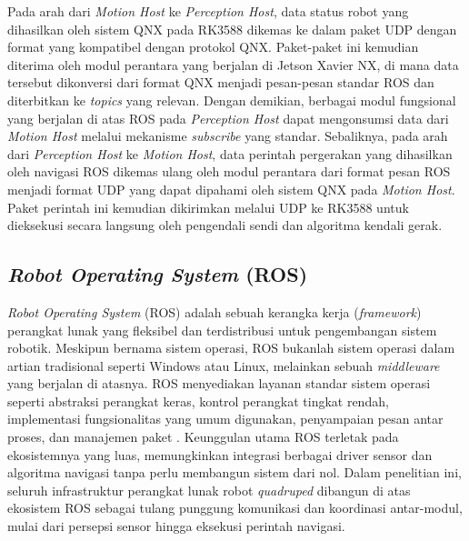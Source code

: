 Pada arah dari \textit{Motion Host} ke \textit{Perception Host}, data status robot yang dihasilkan oleh sistem QNX pada RK3588 dikemas ke dalam paket UDP dengan format yang kompatibel dengan protokol QNX. Paket-paket ini kemudian diterima oleh modul perantara yang berjalan di Jetson Xavier NX, di mana data tersebut dikonversi dari format QNX menjadi pesan-pesan standar ROS dan diterbitkan ke \textit{topics} yang relevan. Dengan demikian, berbagai modul fungsional yang berjalan di atas ROS pada \textit{Perception Host} dapat mengonsumsi data dari \textit{Motion Host} melalui mekanisme \textit{subscribe} yang standar. Sebaliknya, pada arah dari \textit{Perception Host} ke \textit{Motion Host}, data perintah pergerakan yang dihasilkan oleh navigasi ROS dikemas ulang oleh modul perantara dari format pesan ROS menjadi format UDP yang dapat dipahami oleh sistem QNX pada \textit{Motion Host}. Paket perintah ini kemudian dikirimkan melalui UDP ke RK3588 untuk dieksekusi secara langsung oleh pengendali sendi dan algoritma kendali gerak. 

\subsection{\textit{Robot Operating System} (ROS)}

\textit{Robot Operating System} (ROS) adalah sebuah kerangka kerja (\textit{framework}) perangkat lunak yang fleksibel dan terdistribusi untuk pengembangan sistem robotik. Meskipun bernama sistem operasi, ROS bukanlah sistem operasi dalam artian tradisional seperti Windows atau Linux, melainkan sebuah \textit{middleware} yang berjalan di atasnya. ROS menyediakan layanan standar sistem operasi seperti abstraksi perangkat keras, kontrol perangkat tingkat rendah, implementasi fungsionalitas yang umum digunakan, penyampaian pesan antar proses, dan manajemen paket \cite{quigley2009ros}. Keunggulan utama ROS terletak pada ekosistemnya yang luas, memungkinkan integrasi berbagai driver sensor dan algoritma navigasi tanpa perlu membangun sistem dari nol. Dalam penelitian ini, seluruh infrastruktur perangkat lunak robot \textit{quadruped} dibangun di atas ekosistem ROS sebagai tulang punggung komunikasi dan koordinasi antar-modul, mulai dari persepsi sensor hingga eksekusi perintah navigasi.

